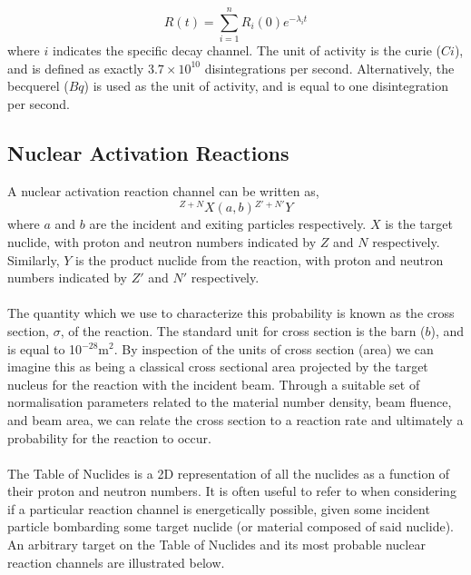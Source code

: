 \documentclass[]{article}
\begin{document}
\begin{equation}
R(t) = \sum_{i=1}^{n} R_i(0) e^{-\lambda_i t}
\end{equation}
where $i$ indicates the specific decay channel. The unit of activity is the curie ($Ci$), and is defined as exactly $3.7\times 10^{10}$ disintegrations per second. Alternatively, the becquerel ($Bq$) is used as the unit of activity, and is equal to one disintegration per second.
\subsection{Nuclear Activation Reactions}
A nuclear activation reaction channel can be written as,
\begin{equation}
	{}^{Z+N}X(a,b){}^{Z'+N'}Y
\end{equation}
where $a$ and $b$ are the incident and exiting particles respectively. $X$ is the target nuclide, with proton and neutron numbers indicated by $Z$ and $N$ respectively. Similarly, $Y$ is the product nuclide from the reaction, with proton and neutron numbers indicated by $Z'$ and $N'$ respectively.\\\\
The quantity which we use to characterize this probability is known as the cross section, $\sigma$, of the reaction. The standard unit for cross section is the barn ($b$), and is equal to 10$^{-28}$m$^2$. By inspection of the units of cross section (area) we can imagine this as being a classical cross sectional area projected by the target nucleus for the reaction with the incident beam. Through a suitable set of normalisation parameters related to the material number density, beam fluence, and beam area, we can relate the cross section to a reaction rate and ultimately a probability for the reaction to occur. \\\\
The Table of Nuclides is a 2D representation of all the nuclides as a function of their proton and neutron numbers. It is often useful to refer to when considering if a particular reaction channel is energetically possible, given some incident particle bombarding some target nuclide (or material composed of said nuclide). An arbitrary target on the Table of Nuclides and its most probable nuclear reaction channels are illustrated below.
\end{document}
